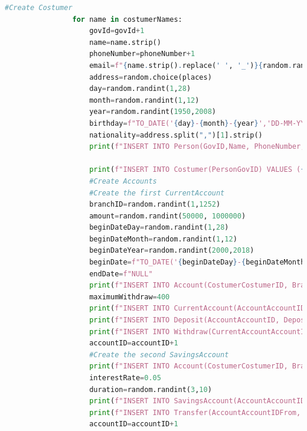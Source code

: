 \documentclass[a4paper, 10pt]{article}
\begin{document}
\begin{lstlisting}[language=python]
                #Create Costumer
                for name in costumerNames:
                    govId=govId+1
                    name=name.strip()
                    phoneNumber=phoneNumber+1
                    email=f"{name.strip().replace(' ', '_')}{random.randint(0,100)}@sapo.pt"
                    address=random.choice(places)
                    day=random.randint(1,28)
                    month=random.randint(1,12)
                    year=random.randint(1950,2008)
                    birthday=f"TO_DATE('{day}-{month}-{year}','DD-MM-YYYY')"
                    nationality=address.split(",")[1].strip()
                    print(f"INSERT INTO Person(GovID,Name, PhoneNumber, Email, Address, Birthday, Nationality) VALUES ({govId},'{name}','{phoneNumber}', '{email}', '{address}', {birthday}, '{nationality}');")

                    print(f"INSERT INTO Costumer(PersonGovID) VALUES ({govId});")
                    #Create Accounts
                    #Create the first CurrentAccount
                    branchID=random.randint(1,1252)
                    amount=random.randint(50000, 1000000)
                    beginDateDay=random.randint(1,28)
                    beginDateMonth=random.randint(1,12)
                    beginDateYear=random.randint(2000,2018)
                    beginDate=f"TO_DATE('{beginDateDay}-{beginDateMonth}-{beginDateYear}','DD-MM-YYYY')"
                    endDate=f"NULL"
                    print(f"INSERT INTO Account(CostumerCostumerID, BranchBranchID, Amount, BeginDate, EndDate) VALUES ({costumerID}, {branchID}, {amount/4}, {beginDate}, {endDate});")
                    maximumWithdraw=400
                    print(f"INSERT INTO CurrentAccount(AccountAccountID, MaximumWithdraw) VALUES ({accountID}, {maximumWithdraw});")
                    print(f"INSERT INTO Deposit(AccountAccountID, DepositDate, Amount) VALUES ({accountID}, {beginDate},{amount});")
                    print(f"INSERT INTO Withdraw(CurrentAccountAccountID, WithdrawDate, Amount) VALUES ({accountID}, {beginDate}, {amount/4});")
                    accountID=accountID+1
                    #Create the second SavingsAccount
                    print(f"INSERT INTO Account(CostumerCostumerID, BranchBranchID, Amount, BeginDate, EndDate) VALUES ({costumerID}, {branchID}, {amount/2}, {beginDate}, {endDate});")
                    interestRate=0.05
                    duration=random.randint(3,10)
                    print(f"INSERT INTO SavingsAccount(AccountAccountID, InterestRate, DurationYears) VALUES ({accountID}, {interestRate}, {duration});")
                    print(f"INSERT INTO Transfer(AccountAccountIDFrom, AccountAccountIDTo, TransferDate, Amount) VALUES ({accountID-1}, {accountID}, {beginDate}, {amount/2});")
                    accountID=accountID+1


\end{lstlisting}
\end{document}
